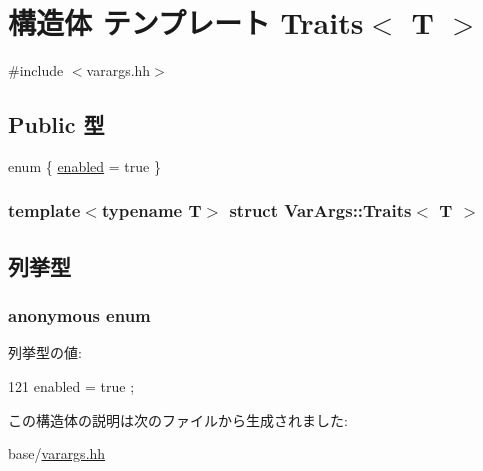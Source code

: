 \hypertarget{structVarArgs_1_1Traits}{
\section{構造体 テンプレート Traits$<$ T $>$}
\label{structVarArgs_1_1Traits}
}


{\ttfamily \#include $<$varargs.hh$>$}\subsection*{Public 型}
\begin{DoxyCompactItemize}
\item 
enum \{ \hyperlink{structVarArgs_1_1Traits_aaf8fd5f0e57d456151c951e0f3715fc4aba6a78ff01a05c6cc4cfb2f4ca21cedc}{enabled} =  true
 \}
\end{DoxyCompactItemize}
\subsubsection*{template$<$typename T$>$ struct VarArgs::Traits$<$ T $>$}



\subsection{列挙型}
\hypertarget{structVarArgs_1_1Traits_aaf8fd5f0e57d456151c951e0f3715fc4}{
\subsubsection[{"@23}]{\setlength{\rightskip}{0pt plus 5cm}anonymous enum}}
\label{structVarArgs_1_1Traits_aaf8fd5f0e57d456151c951e0f3715fc4}
\begin{Desc}
\item[列挙型の値: ]\par
\begin{description}
\item[{\em 
\hypertarget{structVarArgs_1_1Traits_aaf8fd5f0e57d456151c951e0f3715fc4aba6a78ff01a05c6cc4cfb2f4ca21cedc}{
enabled}
\label{structVarArgs_1_1Traits_aaf8fd5f0e57d456151c951e0f3715fc4aba6a78ff01a05c6cc4cfb2f4ca21cedc}
}]\end{description}
\end{Desc}




\begin{DoxyCode}
121 { enabled = true };
\end{DoxyCode}


この構造体の説明は次のファイルから生成されました:\begin{DoxyCompactItemize}
\item 
base/\hyperlink{varargs_8hh}{varargs.hh}\end{DoxyCompactItemize}
